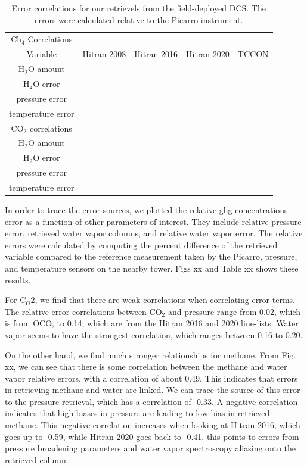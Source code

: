 \documentclass[amt, manuscript]{copernicus}
\begin{document}
\begin{table}
  \centering
  \begin{tabular}{| c | c | c | c | c |}
    Ch$_4$ Correlations & & & \\
    Variable & Hitran 2008 & Hitran 2016 & Hitran 2020 & TCCON \\
    \hline 
    H$_2$O amount & & & \\
    H$_2$O error & & & & \\
    pressure error & & & & \\
    temperature error & & & & \\
    \hline
    CO$_2$ correlations & & & & \\
        H$_2$O amount & & & \\
    H$_2$O error & & & & \\
    pressure error & & & & \\
    temperature error & & & & \\
    \hline

  \end{tabular}
  \caption{Error correlations for our retrievels from the field-deployed DCS. The errors were calculated relative to the Picarro instrument.}
  \label{tab:2}
\end{table}
In order to trace the error sources, we plotted the relative ghg concentrations error as a function of other parameters of interest. They include relative pressure error, retrieved water vapor columns, and relative water vapor error. The relative errors were calculated by computing the percent difference of the retrieved variable compared to the reference measurement taken by the Picarro, pressure, and temperature sensors on the nearby tower. Figs xx and Table xx shows these results. 

For C$_O2$, we find that there are weak correlations when correlating error terms. The relative error correlations between CO$_2$ and pressure range from 0.02, which is from OCO, to 0.14, which are from the Hitran 2016 and 2020 line-lists. Water vapor seems to have the strongest correlation, which ranges between 0.16 to 0.20. 

On the other hand, we find much stronger relationships for methane. From Fig. xx, we can see that there is some correlation between the methane and water vapor relative errors, with a correlation of about 0.49. This indicates that errors in retrieving methane and water are linked. We can trace the source of this error to the pressure retrieval, which has a correlation of -0.33. A negative correlation indicates that high biases in pressure are leading to low bias in retrieved methane. This negative correlation increases when looking at Hitran 2016, which goes up to -0.59, while Hitran 2020 goes back to -0.41. this points to errors from pressure broadening parameters and water vapor spectroscopy aliasing onto the retrieved column.
\end{document}

